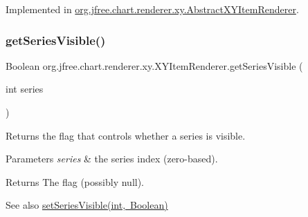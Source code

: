 Implemented in \mbox{\hyperlink{classorg_1_1jfree_1_1chart_1_1renderer_1_1xy_1_1_abstract_x_y_item_renderer_a3c3f7975bbf00e6cc660138ce51f517c}{org.\+jfree.\+chart.\+renderer.\+xy.\+Abstract\+X\+Y\+Item\+Renderer}}.

\mbox{\label{interfaceorg_1_1jfree_1_1chart_1_1renderer_1_1xy_1_1_x_y_item_renderer_acb62c922b439c9311e3e71d2d69b0823}} 
\subsubsection{\texorpdfstring{get\+Series\+Visible()}{getSeriesVisible()}\hspace{0.1cm}{\footnotesize\ttfamily [1/2]}}
{\footnotesize\ttfamily Boolean org.\+jfree.\+chart.\+renderer.\+xy.\+X\+Y\+Item\+Renderer.\+get\+Series\+Visible (\begin{DoxyParamCaption}\item[{int}]{series }\end{DoxyParamCaption})}

Returns the flag that controls whether a series is visible.


\begin{DoxyParams}{Parameters}
{\em series} & the series index (zero-\/based).\\
\hline
\end{DoxyParams}
\begin{DoxyReturn}{Returns}
The flag (possibly {\ttfamily null}).
\end{DoxyReturn}
\begin{DoxySeeAlso}{See also}
\mbox{\hyperlink{interfaceorg_1_1jfree_1_1chart_1_1renderer_1_1xy_1_1_x_y_item_renderer_a602bc5ae9818a0567f42436dc0560157}{set\+Series\+Visible(int, Boolean)}} 
\end{DoxySeeAlso}
\mbox{\label{interfaceorg_1_1jfree_1_1chart_1_1renderer_1_1xy_1_1_x_y_item_renderer_a03640ef642c53d0ccd4ee5dfd9b49a63}} 
